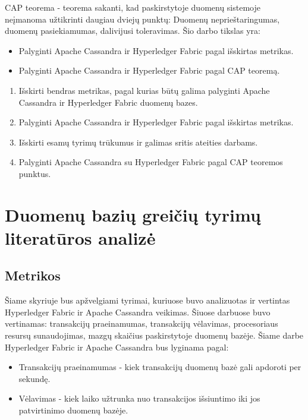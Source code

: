 \documentclass{VUMIFPSkursinis}
\begin{document}

CAP teorema - teorema sakanti, kad paskirstytoje duomenų sistemoje neįmanoma užtikrinti daugiau dviejų punktų: Duomenų neprieštaringumas, duomenų pasiekiamumas, dalivijusi toleravimas. \newline
Šio darbo tikslas yra:
\begin{itemize}
\item{Palyginti Apache Cassandra ir Hyperledger Fabric pagal išskirtas metrikas.}
\item{Palyginti Apache Cassandra ir Hyperledger Fabric pagal CAP teoremą.}
\end{itemize}

\begin{enumerate}
\item{Išskirti bendras metrikas, pagal kurias būtų galima palyginti Apache Cassandra ir Hyperledger Fabric duomenų bazes.}
\item{Palyginti Apache Cassandra ir Hyperledger Fabric pagal išskirtas metrikas.}
\item{Išskirti esamų tyrimų trūkumus ir galimas sritis ateities darbams.}
\item{Palyginti Apache Cassandra su Hyperledger Fabric pagal CAP teoremos punktus.}
\end{enumerate}
\pagebreak
\section{Duomenų bazių greičių tyrimų literatūros analizė}

\subsection{Metrikos}
Šiame skyriuje bus apžvelgiami tyrimai, kuriuose buvo analizuotas ir vertintas Hyperledger Fabric \cite{IMBResearch,ThailandPerf,ShaFabPerf} ir Apache Cassandra \cite{BITCass,MonCas} veikimas. 
Šiuose darbuose buvo vertinamas: transakcijų praeinamumas, transakcijų vėlavimas, procesoriaus resursų sunaudojimas, mazgų skaičius paskirstytoje duomenų bazėje. \newline
Šiame darbe Hyperledger Fabric ir Apache Cassandra bus lyginama pagal:
\begin{itemize}
\item{Transakcijų praeinamumas - kiek transakcijų duomenų bazė gali apdoroti per sekundę.}
\item{Vėlavimas - kiek laiko užtrunka nuo transakcijos išsiuntimo iki jos patvirtinimo duomenų bazėje.}
\end{itemize}
\end{document}
